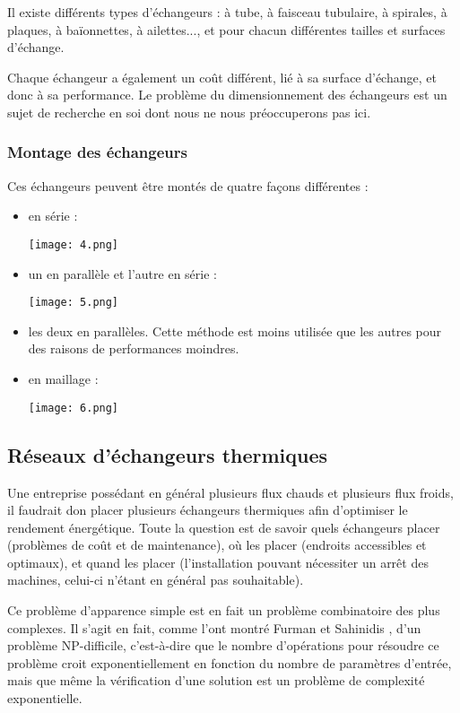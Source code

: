 Il existe différents types d'échangeurs : à tube, à faisceau tubulaire, à spirales, à plaques, à baïonnettes, à ailettes..., et pour chacun différentes tailles et surfaces d'échange.

Chaque échangeur a également un coût différent, lié à sa surface d'échange, et donc à sa performance. Le problème du dimensionnement des échangeurs est un sujet de recherche en soi dont nous ne nous préoccuperons pas ici. 

\subsubsection{Montage des échangeurs}

Ces échangeurs peuvent être montés de quatre façons différentes : 
\begin{itemize}
\item en série : 

\texttt{[image: 4.png]}

\item un en parallèle et l'autre en série : 

\texttt{[image: 5.png]}

\item les deux en parallèles. Cette méthode est moins utilisée que les autres pour des raisons de performances moindres.

\item en maillage : 

\texttt{[image: 6.png]}

\end{itemize}


\subsection{Réseaux d'échangeurs thermiques}

Une entreprise possédant en général plusieurs flux chauds et plusieurs flux froids, il faudrait don placer plusieurs échangeurs thermiques afin d'optimiser le rendement énergétique. Toute la question est de savoir quels échangeurs placer (problèmes de coût et de maintenance), où les
placer (endroits accessibles et optimaux), et quand les placer (l'installation pouvant nécessiter
un arrêt des machines, celui-ci n'étant en général pas souhaitable).

Ce problème d'apparence simple est en fait un problème combinatoire des plus complexes. Il s'agit en fait, comme l'ont montré Furman et Sahinidis \cite{NP}, d'un problème NP-difficile, c'est-à-dire que le nombre d'opérations pour résoudre ce problème croit exponentiellement en fonction du nombre de paramètres d'entrée, mais que même la vérification d'une solution est un problème de complexité exponentielle.

